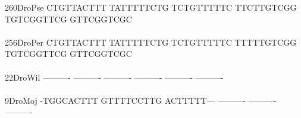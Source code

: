 \documentclass[11pt,twoside,reqno,a4paper]{article}
\begin{document}
{260\hspace*{2\charwidth}DroPse	CTGTTACTTT	TATTTTTCTG	TCTGTTTTTC	TTCTTGTCGG	TGTCGGTTCG	GTTCGGTCGC	\\
\hspace*{5\charwidth}\hspace*{7\charwidth}\hspace*{1\charwidth}\hspace*{1\charwidth}\hspace*{1\charwidth}\hspace*{1\charwidth}\hspace*{1\charwidth}\hspace*{1\charwidth}\\
256\hspace*{2\charwidth}DroPer	CTGTTACTTT	TATTTTTCTG	TCTGTTTTTC	TTTTTGTCGG	TGTCGGTTCG	GTTCGGTCGC	\\
\hspace*{5\charwidth}\hspace*{7\charwidth}\hspace*{1\charwidth}\hspace*{1\charwidth}\hspace*{1\charwidth}\hspace*{1\charwidth}\hspace*{1\charwidth}\hspace*{1\charwidth}\\
22\hspace*{3\charwidth}DroWil	----------	----------	----------	----------	----------	----------	\\
\hspace*{5\charwidth}\hspace*{7\charwidth}\hspace*{1\charwidth}\hspace*{1\charwidth}\hspace*{1\charwidth}\hspace*{1\charwidth}\hspace*{1\charwidth}\hspace*{1\charwidth}\\
9\hspace*{4\charwidth}DroMoj	-TGGCACTTT	GTTTTCCTTG	ACTTTTT---	----------	----------	----------	\\
\hspace*{5\charwidth}\hspace*{7\charwidth}\hspace*{1\charwidth}\hspace*{1\charwidth}\hspace*{1\charwidth}\hspace*{1\charwidth}\hspace*{1\charwidth}\hspace*{1\charwidth}\\
}
\end{document}
